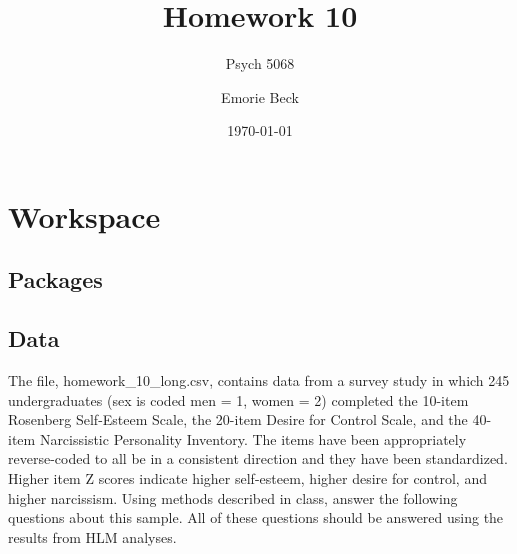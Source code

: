 \documentclass[]{article}
\title{Homework 10}
\subtitle{Psych 5068}
\author{Emorie Beck}
\date{\today}
\newenvironment{Shaded}{\begin{snugshade}}{\end{snugshade}}
\newcommand{\KeywordTok}[1]{\textcolor[rgb]{0.13,0.29,0.53}{\textbf{#1}}}
\newcommand{\DataTypeTok}[1]{\textcolor[rgb]{0.13,0.29,0.53}{#1}}
\newcommand{\DecValTok}[1]{\textcolor[rgb]{0.00,0.00,0.81}{#1}}
\newcommand{\StringTok}[1]{\textcolor[rgb]{0.31,0.60,0.02}{#1}}
\newcommand{\OperatorTok}[1]{\textcolor[rgb]{0.81,0.36,0.00}{\textbf{#1}}}
\newcommand{\NormalTok}[1]{#1}
\begin{document}
\maketitle

{
\setcounter{tocdepth}{2}
\tableofcontents
}
\section{Workspace}\label{workspace}

\subsection{Packages}\label{packages}

\subsection{Data}\label{data}

\begin{Shaded}
\end{Shaded}

The file, homework\_10\_long.csv, contains data from a survey study in
which 245 undergraduates (sex is coded men = 1, women = 2) completed the
10-item Rosenberg Self-Esteem Scale, the 20-item Desire for Control
Scale, and the 40-item Narcissistic Personality Inventory. The items
have been appropriately reverse-coded to all be in a consistent
direction and they have been standardized. Higher item Z scores indicate
higher self-esteem, higher desire for control, and higher narcissism.
Using methods described in class, answer the following questions about
this sample. All of these questions should be answered using the results
from HLM analyses.
\end{document}
